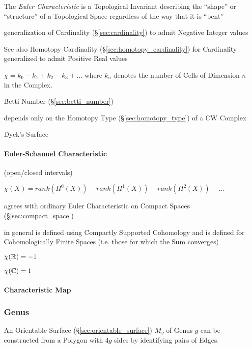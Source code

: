 The \emph{Euler Characteristic} is a Topological Invariant describing the
``shape'' or ``structure'' of a Topological Space regardless of the way that it
is ``bent''

generalization of Cardinality (\S\ref{sec:cardinality}) to admit
Negative Integer values

\fist See also Homotopy Cardinality (\S\ref{sec:homotopy_cardinality})
for Cardinality generalized to admit Positive Real values

$\chi = k_0 - k_1 + k_2 - k_3 + \ldots$ where $k_n$ denotes the number
of Cells of Dimension $n$ in the Complex.

Betti Number (\S\ref{sec:betti_number})

depends only on the Homotopy Type (\S\ref{sec:homotopy_type}) of a
CW Complex \cite{hatcher02}

Dyck's Surface



\paragraph{Euler-Schanuel Characteristic}\label{sec:euler_schanuel}\hfill

(open/closed intervals) %

$\chi(X) = rank (H^0(X)) - rank (H^1(X)) + rank (H^2(X)) - \ldots$

agrees with ordinary Euler Characteristic on Compact Spaces
(\S\ref{sec:compact_space})

in general is defined using Compactly Supported Cohomology and is
defined for Cohomologically Finite Spaces (i.e. those for which the
Sum converges) %

$\chi(\mathbb{R}) = -1$

$\chi(\mathbb{C}) = 1$



\paragraph{Characteristic Map}\label{sec:characteristic_map}\hfill




\subsubsection{Genus}\label{sec:genus}

An Orientable Surface (\S\ref{sec:orientable_surface}) $M_g$ of Genus $g$ can
be constructed from a Polygon with $4g$ sides by identifying pairs of Edges.



